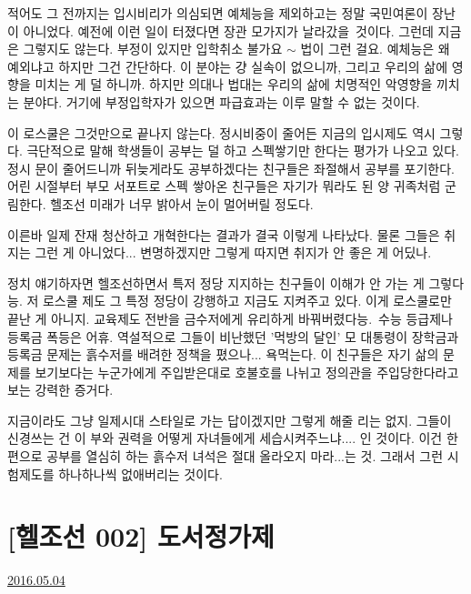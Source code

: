 적어도 그 전까지는 입시비리가 의심되면 예체능을 제외하고는 정말 국민여론이 장난이 아니었다.
예전에 이런 일이 터졌다면 장관 모가지가 날라갔을 것이다.
그런데 지금은 그렇지도 않는다. 부정이 있지만 입학취소 불가요 $\sim$ 법이 그런 걸요.
예체능은 왜 예외냐고 하지만 그건 간단하다. 이 분야는 걍 실속이 없으니까, 그리고 우리의 삶에 영향을 미치는 게 덜 하니까.
하지만 의대나 법대는 우리의 삶에 치명적인 악영향을 끼치는 분야다. 거기에 부정입학자가 있으면 파급효과는 이루 말할 수 없는 것이다.
\vspace{5mm}

이 로스쿨은 그것만으로 끝나지 않는다. 정시비중이 줄어든 지금의 입시제도 역시 그렇다.
극단적으로 말해 학생들이 공부는 덜 하고 스펙쌓기만 한다는 평가가 나오고 있다.
정시 문이 줄어드니까 뒤늦게라도 공부하겠다는 친구들은 좌절해서 공부를 포기한다.
어린 시절부터 부모 서포트로 스펙 쌓아온 친구들은 자기가 뭐라도 된 양 귀족처럼 군림한다.
헬조선 미래가 너무 밝아서 눈이 멀어버릴 정도다.
\vspace{5mm}

이른바 일제 잔재 청산하고 개혁한다는 결과가 결국 이렇게 나타났다.
물론 그들은 취지는 그런 게 아니었다... 변명하겠지만 그렇게 따지면 취지가 안 좋은 게 어딨나.
\vspace{5mm}

정치 얘기하자면 헬조선하면서 특저 정당 지지하는 친구들이 이해가 안 가는 게 그렇다능.
저 로스쿨 제도 그 특정 정당이 강행하고 지금도 지켜주고 있다. 이게 로스쿨로만 끝난 게 아니지.
교육제도 전반을 금수저에게 유리하게 바꿔버렸다능. 수능 등급제나 등록금 폭등은 어휴.
역설적으로 그들이 비난했던 '먹방의 달인' 모 대통령이 장학금과 등록금 문제는 흙수저를 배려한 정책을 폈으나... 욕먹는다.
이 친구들은 자기 삶의 문제를 보기보다는 누군가에게 주입받은대로 호불호를 나뉘고 정의관을 주입당한다라고보는 강력한 증거다.
\vspace{5mm}

지금이라도 그냥 일제시대 스타일로 가는 답이겠지만 그렇게 해줄 리는 없지.
그들이 신경쓰는 건 이 부와 권력을 어떻게 자녀들에게 세습시켜주느냐.... 인 것이다.
이건 한편으로 공부를 열심히 하는 흙수저 녀석은 절대 올라오지 마라...는 것. 그래서 그런 시험제도를 하나하나씩 없애버리는 것이다.
\vspace{5mm}






\section{[헬조선 002] 도서정가제}
\href{https://www.kockoc.com/Apoc/759676}{2016.05.04}

